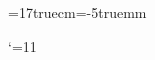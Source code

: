 \def \half {{\textstyle {1 \over 2}}}
\def \third {{\textstyle {1 \over 3}}}
\def \quarter {{\textstyle {1 \over 4}}}
\def \fifth {{\textstyle {1 \over 5}}}
\def \sixth {{\textstyle {1 \over 6}}}


\def\boxit#1{\vbox{\hrule\hbox{\vrule\kern1pt\vbox
{\kern1pt#1\kern1pt}\kern1pt\vrule}\hrule}}

\def \i {\item} \def \ii {\itemitem} \def \iii {\item\item\item}
\def \bdot {\ii{$\bullet$}}
\def \cl {\centerline}
\def\h{\hfill\break}
\parskip=6pt
\parindent=0pt
\hsize=17truecm\hoffset=-5truemm
\def\footnoterule{\kern-3pt
\hrule width 17truecm \kern 2.6pt}


\catcode`\@=11 %

